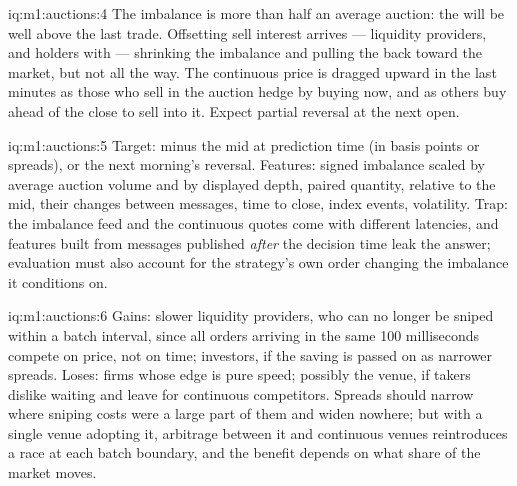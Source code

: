 \begin{solution}{iq:m1:auctions:4}
The imbalance is more than half an average auction: the 
will be well above the last trade. Offsetting sell interest arrives ---
liquidity providers, and holders with  --- shrinking
the imbalance and pulling the  back toward the market, but
not all the way. The continuous price is dragged upward in the last minutes
as those who sell in the auction hedge by buying now, and as others buy ahead
of the close to sell into it. Expect partial reversal at the next open.
\end{solution}

\begin{solution}{iq:m1:auctions:5}
Target:  minus the mid at prediction time (in basis points or
spreads), or the next morning's reversal. Features: signed imbalance scaled
by average auction volume and by displayed depth, paired quantity,  relative to the mid, their changes between messages, time to close,
index events, volatility. Trap: the imbalance feed and the continuous quotes
come with different latencies, and features built from messages published
\emph{after} the decision time leak the answer; evaluation must also account
for the strategy's own order changing the imbalance it conditions on.
\end{solution}

\begin{solution}{iq:m1:auctions:6}
Gains: slower liquidity providers, who can no longer be sniped within a
batch interval, since all orders arriving in the same 100 milliseconds
compete on price, not on time; investors, if the saving is passed on as
narrower spreads. Loses: firms whose edge is pure speed; possibly the venue,
if takers dislike waiting and leave for continuous competitors. Spreads
should narrow where sniping costs were a large part of them and widen nowhere;
but with a single venue adopting it, arbitrage between it and continuous
venues reintroduces a race at each batch boundary, and the benefit depends on
what share of the market moves.
\end{solution}
